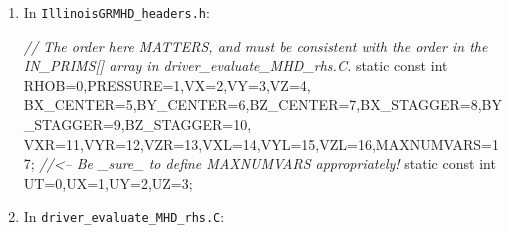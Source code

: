 \documentclass[landscape,letterpaper,10pt,english]{article}
\newenvironment{Shaded}{}{}
\newcommand{\DataTypeTok}[1]{\textcolor[rgb]{0.56,0.13,0.00}{{#1}}}
\newcommand{\DecValTok}[1]{\textcolor[rgb]{0.25,0.63,0.44}{{#1}}}
\newcommand{\CommentTok}[1]{\textcolor[rgb]{0.38,0.63,0.69}{\textit{{#1}}}}
\newcommand{\NormalTok}[1]{{#1}}
\begin{document}
\begin{enumerate}
\def\labelenumi{\arabic{enumi}.}
\item
  In \texttt{IllinoisGRMHD\_headers.h}:

\begin{Shaded}
\begin{Highlighting}[]
\CommentTok{// The order here MATTERS, and must be consistent with the order in the IN_PRIMS[] array in driver_evaluate_MHD_rhs.C.}
\DataTypeTok{static} \DataTypeTok{const} \DataTypeTok{int}\NormalTok{ RHOB=}\DecValTok{0}\NormalTok{,PRESSURE=}\DecValTok{1}\NormalTok{,VX=}\DecValTok{2}\NormalTok{,VY=}\DecValTok{3}\NormalTok{,VZ=}\DecValTok{4}\NormalTok{,}
\NormalTok{  BX_CENTER=}\DecValTok{5}\NormalTok{,BY_CENTER=}\DecValTok{6}\NormalTok{,BZ_CENTER=}\DecValTok{7}\NormalTok{,BX_STAGGER=}\DecValTok{8}\NormalTok{,BY_STAGGER=}\DecValTok{9}\NormalTok{,BZ_STAGGER=}\DecValTok{10}\NormalTok{,}
\NormalTok{  VXR=}\DecValTok{11}\NormalTok{,VYR=}\DecValTok{12}\NormalTok{,VZR=}\DecValTok{13}\NormalTok{,VXL=}\DecValTok{14}\NormalTok{,VYL=}\DecValTok{15}\NormalTok{,VZL=}\DecValTok{16}\NormalTok{,MAXNUMVARS=}\DecValTok{17}\NormalTok{;  }\CommentTok{//<-- Be _sure_ to define MAXNUMVARS appropriately!}
\DataTypeTok{static} \DataTypeTok{const} \DataTypeTok{int}\NormalTok{ UT=}\DecValTok{0}\NormalTok{,UX=}\DecValTok{1}\NormalTok{,UY=}\DecValTok{2}\NormalTok{,UZ=}\DecValTok{3}\NormalTok{;}
\end{Highlighting}
\end{Shaded}
\item
  In \texttt{driver\_evaluate\_MHD\_rhs.C}:


\end{enumerate}
\end{document}
